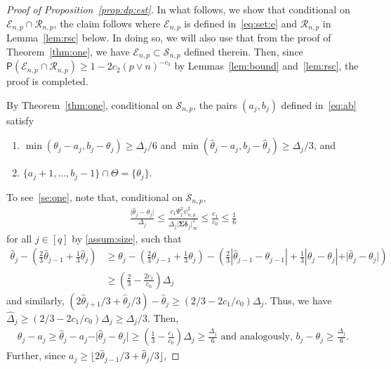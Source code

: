 \documentclass[11pt, a4paper]{article}
\newcommand{\mc}{\mathcal}
\renewcommand{\l}{\left}
\renewcommand{\r}{\right}
\def\wh{\widehat}
\newcommand{\cp}{\theta}
\newcommand{\Cp}{\Theta}
\newcommand{\p}{\mathsf{P}}
\theoremstyle{definition}
\theoremstyle{definition}
\theoremstyle{definition}
\theoremstyle{definition}
\theoremstyle{definition}
\theoremstyle{remark}
\theoremstyle{definition}
\theoremstyle{definition}
\theoremstyle{definition}
\begin{document}
\begin{proof}[Proof of Proposition~\ref{prop:dp:est}]
	In what follows, we show that conditional on $\mc E_{n, p} \cap \mc R_{n, p}$, the claim follows where $\mc E_{n, p}$ is defined in~\eqref{eq:set:e} and $\mc R_{n, p}$ in Lemma~\ref{lem:rsc} below. 
	In doing so, we will also use that from the proof of Theorem~\ref{thm:one}, we have $\mc E_{n, p} \subset \mc S_{n, p}$ defined therein.
	Then, since $\p(\mc E_{n, p} \cap \mc R_{n, p}) \ge 1 - 2c_2 (p \vee n)^{-c_3}$ by Lemmas~\ref{lem:bound} and~\ref{lem:rsc}, the proof is completed.
	
	By Theorem~\ref{thm:one}, conditional on $\mc S_{n, p}$, the pairs $(a_j, b_j)$ defined in~\eqref{eq:ab} satisfy
	\begin{enumerate}[label = (\alph*)]
		\item \label{se:one} $\min(\cp_j - a_j, b_j - \cp_j) \ge \Delta_j/6$ and $\min(\wh\cp_j - a_j, b_j - \wh\cp_j) \ge \Delta_j/3$, and
		\item \label{se:two} $\{a_j + 1, \ldots, b_j - 1\} \cap \Cp = \{\cp_j\}$.
	\end{enumerate}
	To see~\ref{se:one}, note that, conditional on $\mc S_{n, p}$, 
	\begin{align*}
	\frac{\vert \wh\cp_j - \cp_j \vert}{\Delta_j} \le \frac{c_1\Psi_j^2 \psi_{n, p}^2}{ \Delta_j \vert \bm\Sigma \bm\delta_j \vert_\infty^{2}} \le \frac{c_1}{c_0}\le \frac{1}{6}
	\end{align*}
	for all $j \in [q]$ by \cref{assum:size}, such that
	\begin{align*}
	\wh\cp_j - \l(\frac{2}{3} \wh\cp_{j - 1} + \frac{1}{3} \wh\cp_j \r) &\ge \cp_j - \l(\frac{2}{3} \cp_{j - 1} + \frac{1}{3} \cp_j \r) - \l( \frac{2}{3} \l\vert \wh\cp_{j - 1} - \cp_{j - 1} \r\vert + \frac{1}{3} \l\vert \wh\cp_j - \cp_j \r\vert + \vert \wh\cp_j - \cp_j \vert \r)
	\\
	&\ge \l(\frac{2}{3} - \frac{2c_1}{c_0}\r) \Delta_j
	\end{align*}
	and similarly, $(2\wh\cp_{j + 1}/3 + \wh\cp_j/3) - \wh\cp_j \ge (2/3 - 2c_1/c_0)\Delta_j$.
	Thus, we have $\wh{\Delta}_j \ge (2/3 - 2c_1/c_0) \Delta_j \ge \Delta_j/3$.
	Then,
	\begin{align*}
	\cp_j - a_j \ge \wh\cp_j - a_j - \vert \wh\cp_j - \cp_j \vert \ge \l( \frac{1}{3} - \frac{c_1}{c_0} \r) \Delta_j \ge \frac{\Delta_j}{6} \text{ \ and analogously, \ } b_j - \cp_j \ge \frac{\Delta_j}{6}.
	\end{align*}
	Further, since $a_j \ge \lfloor 2\wh\cp_{j - 1}/3 + \wh\cp_j / 3 \rfloor$,

\end{proof}
\end{document}

